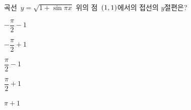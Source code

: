 곡선~$y=\sqrt{1+\sin \pi x}$ 위의 점~$(1{,}\mkern3mu\mathopen{}1)$에서의 접선의 $y$절편은?
\begin{choices32}{\rule[-3ex]{0pt}{8ex}$-\dfrac{\pi}{2}-1$}{\rule[-3ex]{0pt}{8ex}$-\dfrac{\pi}{2}+1$}{\rule[-3ex]{0pt}{8ex}$\dfrac{\pi}{2}-1$}{\rule[-3ex]{0pt}{8ex}$\dfrac{\pi}{2}+1$}{\rule[-3ex]{0pt}{8ex}$\pi+1$}\end{choices32}
